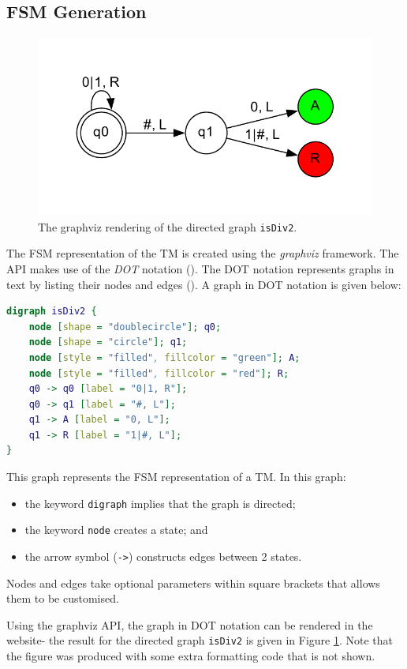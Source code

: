 \subsection{FSM Generation}
\begin{figure}[htb]
    \centering
    \includegraphics[scale=0.7]{images/graphviz_isDiv2.pdf}
    \caption{The graphviz rendering of the directed graph \texttt{isDiv2}.}
    \label{fig:graphviz_isDiv2}
\end{figure}

The FSM representation of the TM is created using the \emph{graphviz} framework. The API makes use of the \emph{DOT} notation (\cite{graphviz}). The DOT notation represents graphs in text by listing their nodes and edges (\cite{dot}). A graph in DOT notation is given below:
\begin{lstlisting}[language=DOT]
digraph isDiv2 {
    node [shape = "doublecircle"]; q0;
    node [shape = "circle"]; q1;
    node [style = "filled", fillcolor = "green"]; A;
    node [style = "filled", fillcolor = "red"]; R;
    q0 -> q0 [label = "0|1, R"];
    q0 -> q1 [label = "#, L"];
    q1 -> A [label = "0, L"];
    q1 -> R [label = "1|#, L"];
}
\end{lstlisting}
This graph represents the FSM representation of a TM. In this graph:
\begin{itemize}
    \item the keyword \texttt{digraph} implies that the graph is directed;
    \item the keyword \texttt{node} creates a state; and
    \item the arrow symbol (\texttt{->}) constructs edges between 2 states.
\end{itemize}
Nodes and edges take optional parameters within square brackets that allows them to be customised.

Using the graphviz API, the graph in DOT notation can be rendered in the website- the result for the directed graph \texttt{isDiv2} is given in Figure \ref{fig:graphviz_isDiv2}. Note that the figure was produced with some extra formatting code that is not shown.


